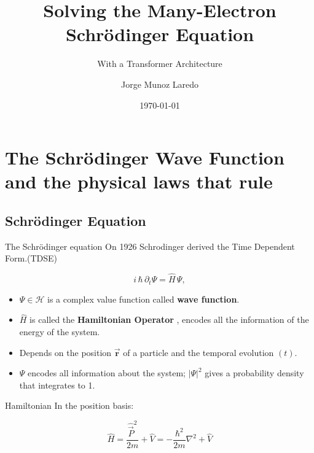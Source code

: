 \documentclass{beamer}
\title{Solving the Many-Electron Schr\"odinger Equation}
\subtitle{With a Transformer Architecture}
\author{Jorge Munoz Laredo}
\date{\today}
\begin{document}
\begin{frame}
    \titlepage
\end{frame}



\section{The Schr\"odinger Wave Function and the physical laws that rule}

\subsection{Schr\"odinger Equation}

\begin{frame}{The Schr\"odinger equation}
  On 1926 Schrodinger derived the Time Dependent Form.(TDSE)

\begin{equation}
            i\,\hbar\,\partial_t \Psi = \hat{H}\,\Psi,
\end{equation}


\begin{itemize}
\item $\Psi \in \mathcal{H}$ is a complex value function called \textbf{wave function}.
\item $\hat{H}$ is called the \textbf{Hamiltonian Operator} , encodes all the information of the energy of the system.
\item Depends on the position $\vec{\mathbf{r}}$ of a particle and the temporal evolution $(t)$.
\item $\Psi$ encodes all information about the system; $|\Psi|^2$ gives a probability density that integrates to 1.
\end{itemize}

\begin{block}{Hamiltonian}
In the position basis:

\begin{equation}
\hat{H}=\frac{\hat{\vec{{P}}}^{2}}{2m}+\hat{V} =-\frac{\hbar^{2}}{2m}\nabla^{2}+\hat{V}
\end{equation}

\end{block}
\end{frame}
\end{document}
